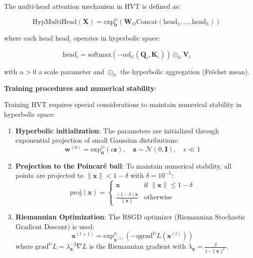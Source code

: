 \begin{definition}\label{def:hvt_multihead}
The multi-head attention mechanism in HVT is defined as:

\begin{equation}
\text{HypMultiHead}(\mathbf{X}) = \text{exp}_{\mathbf{0}}^{\mathbb{H}}\left(\mathbf{W}_O \text{Concat}(\text{head}_1, \ldots, \text{head}_h)\right)
\label{eq:hvt_multihead}
\end{equation}

where each head $\text{head}_i$ operates in hyperbolic space:

\begin{equation}
\text{head}_i = \text{softmax}\left(-\alpha d_{\mathbb{H}}(\mathbf{Q}_i, \mathbf{K}_i)\right) \odot_{\mathbb{H}} \mathbf{V}_i
\label{eq:hvt_head}
\end{equation}

with $\alpha > 0$ a scale parameter and $\odot_{\mathbb{H}}$ the hyperbolic aggregation (Fréchet mean).
\end{definition}

\textbf{Training procedures and numerical stability}:

Training HVT requires special considerations to maintain numerical stability in hyperbolic space:

\begin{enumerate}
    \item \textbf{Hyperbolic initialization}: The parameters are initialized through exponential projection of small Gaussian distributions:
    \begin{equation}
    \mathbf{w}^{(0)} = \text{exp}_{\mathbf{0}}^{\mathbb{H}}(\epsilon \mathbf{z}), \quad \mathbf{z} \sim \mathcal{N}(0, \mathbf{I}), \quad \epsilon \ll 1
    \end{equation}

    \item \textbf{Projection to the Poincaré ball}: To maintain numerical stability, all points are projected to $\|\mathbf{x}\| < 1 - \delta$ with $\delta = 10^{-5}$:
    \begin{equation}
    \text{proj}(\mathbf{x}) = \begin{cases}
    \mathbf{x} & \text{if } \|\mathbf{x}\| \leq 1 - \delta \\
    \frac{(1-\delta)\mathbf{x}}{\|\mathbf{x}\|} & \text{otherwise}
    \end{cases}
    \end{equation}

    \item \textbf{Riemannian Optimization}: The RSGD optimizer (Riemannian Stochastic Gradient Descent) is used:
    \begin{equation}
    \mathbf{x}^{(t+1)} = \text{exp}_{\mathbf{x}^{(t)}}^{\mathbb{H}}\left(-\eta \text{grad}^{\mathbb{H}} L(\mathbf{x}^{(t)})\right)
    \end{equation}
    where $\text{grad}^{\mathbb{H}} L = \lambda_{\mathbf{x}}^{-2} \nabla L$ is the Riemannian gradient with $\lambda_{\mathbf{x}} = \frac{2}{1-\|\mathbf{x}\|^2}$.
\end{enumerate}

